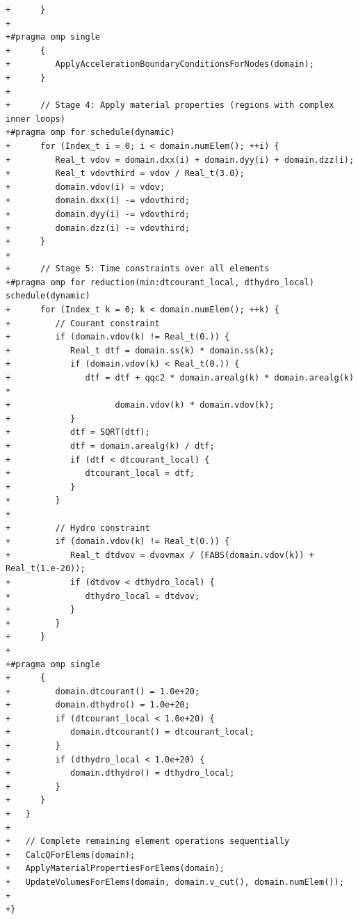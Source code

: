 \begin{lstlisting}
+      }
+
+#pragma omp single
+      {
+         ApplyAccelerationBoundaryConditionsForNodes(domain);
+      }
+
+      // Stage 4: Apply material properties (regions with complex inner loops)
+#pragma omp for schedule(dynamic)
+      for (Index_t i = 0; i < domain.numElem(); ++i) {
+         Real_t vdov = domain.dxx(i) + domain.dyy(i) + domain.dzz(i);
+         Real_t vdovthird = vdov / Real_t(3.0);
+         domain.vdov(i) = vdov;
+         domain.dxx(i) -= vdovthird;
+         domain.dyy(i) -= vdovthird;
+         domain.dzz(i) -= vdovthird;
+      }
+
+      // Stage 5: Time constraints over all elements
+#pragma omp for reduction(min:dtcourant_local, dthydro_local) schedule(dynamic)
+      for (Index_t k = 0; k < domain.numElem(); ++k) {
+         // Courant constraint
+         if (domain.vdov(k) != Real_t(0.)) {
+            Real_t dtf = domain.ss(k) * domain.ss(k);
+            if (domain.vdov(k) < Real_t(0.)) {
+               dtf = dtf + qqc2 * domain.arealg(k) * domain.arealg(k) *
+                     domain.vdov(k) * domain.vdov(k);
+            }
+            dtf = SQRT(dtf);
+            dtf = domain.arealg(k) / dtf;
+            if (dtf < dtcourant_local) {
+               dtcourant_local = dtf;
+            }
+         }
+
+         // Hydro constraint
+         if (domain.vdov(k) != Real_t(0.)) {
+            Real_t dtdvov = dvovmax / (FABS(domain.vdov(k)) + Real_t(1.e-20));
+            if (dtdvov < dthydro_local) {
+               dthydro_local = dtdvov;
+            }
+         }
+      }
+
+#pragma omp single
+      {
+         domain.dtcourant() = 1.0e+20;
+         domain.dthydro() = 1.0e+20;
+         if (dtcourant_local < 1.0e+20) {
+            domain.dtcourant() = dtcourant_local;
+         }
+         if (dthydro_local < 1.0e+20) {
+            domain.dthydro() = dthydro_local;
+         }
+      }
+   }
+
+   // Complete remaining element operations sequentially
+   CalcQForElems(domain);
+   ApplyMaterialPropertiesForElems(domain);
+   UpdateVolumesForElems(domain, domain.v_cut(), domain.numElem());
+
+}\end{lstlisting}
